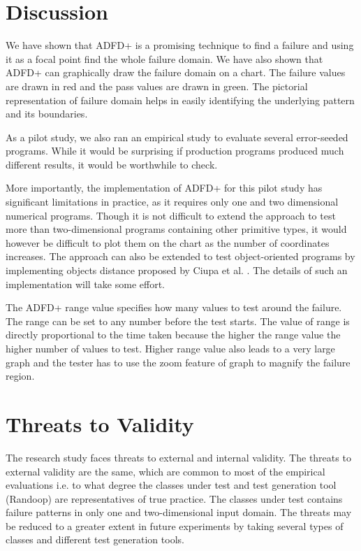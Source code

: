





\section{Discussion}\label{sec:intro6_13}
We have shown that ADFD+ is a promising technique to find a failure and using it as a focal point find the whole failure domain. We have also shown that ADFD+ can graphically draw the failure domain on a chart. The failure values are drawn in red and the pass values are drawn in green. The pictorial representation of failure domain helps in easily identifying the underlying pattern and its boundaries.

As a pilot study, we also ran an empirical study to evaluate several error-seeded programs. While it would be surprising if production programs produced much different results, it would be worthwhile to check.

More importantly, the implementation of ADFD+ for this pilot study has significant limitations in practice, as it requires only one and two dimensional numerical programs. Though it is not difficult to extend the approach to test more than two-dimensional programs containing other primitive types, it would however be difficult to plot them on the chart as the number of coordinates increases. The approach can also be extended to test object-oriented programs by implementing objects distance proposed by Ciupa et al. \cite{ciupa2006object}. The details of such an implementation will take some effort.

The ADFD+ range value specifies how many values to test around the failure. The range can be set to any number before the test starts. The value of range is directly proportional to the time taken because the higher the range value the higher number of values to test. Higher range value also leads to a very large graph and the tester has to use the zoom feature of graph to magnify the failure region.




\section{Threats to Validity}\label{sec:intro6_14}
The research study faces threats to external and internal validity. The threats to external validity are the same, which are common to most of the empirical evaluations i.e. to what degree the classes under test and test generation tool (Randoop) are representatives of true practice. The classes under test contains failure patterns in only one and two-dimensional input domain. The threats may be reduced to a greater extent in future experiments by taking several types of classes and different test generation tools. 

